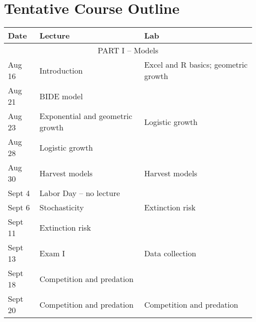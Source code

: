 \documentclass[12pt]{article}
\begin{document}
\clearpage

\section*{\normalsize Tentative Course Outline}

\begin{center}
\begin{tabular}[c]{lll}
\hline \hline
{\bf Date} & {\bf Lecture}                      & {\bf Lab}                      \\
\hline
           \multicolumn{3}{c}{PART I -- Models}                                        \\
\hline
\hline
Aug 16     & Introduction                       & Excel and R basics; geometric growth \\
\hline
Aug 21     & BIDE model                         &                                      \\
Aug 23     & Exponential and geometric growth   & Logistic growth                      \\
\hline
Aug 28     & Logistic growth                    &                                      \\
Aug 30     & Harvest models                     & Harvest models                       \\
\hline
Sept 4     & Labor Day -- no lecture            &                                      \\
Sept 6     & Stochasticity                      & Extinction risk                      \\
\hline
Sept 11    & Extinction risk                    &                                      \\
Sept 13    & Exam I                             & Data collection                      \\
\hline
Sept 18    & Competition and predation          &                                      \\
Sept 20    & Competition and predation          & Competition and predation            \\

\end{tabular}
\end{center}
\end{document}
